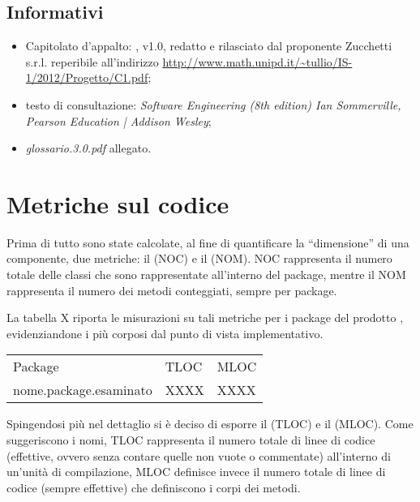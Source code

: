\subsection{Informativi}
\begin{itemize}
\item[] Capitolato d'appalto: \caName{}, v1.0, redatto e rilasciato dal proponente Zucchetti s.r.l. reperibile all'indirizzo \url{http://www.math.unipd.it/~tullio/IS-1/2012/Progetto/C1.pdf};
\item[] testo di consultazione: \textit{Software Engineering (8th edition) Ian Sommerville, Pearson Education | Addison Wesley};
\item[] \textit{glossario.3.0.pdf} allegato.
\end{itemize}
\clearpage

\section{Metriche sul codice}
Prima di tutto sono state calcolate, al fine di quantificare la ``dimensione'' di una componente, due metriche: il  (NOC) e il  (NOM).
NOC rappresenta il numero totale delle classi che sono rappresentate all'interno del package, mentre il NOM rappresenta il numero dei metodi conteggiati, sempre per package.

La tabella X riporta le misurazioni su tali metriche per i package del prodotto \caName{}, evidenziandone i più corposi dal punto di vista implementativo.


\begin{center}
\begin{longtable}{p{}ll}
\toprule Package & TLOC  & MLOC\\
nome.package.esaminato & XXXX & XXXX\\
\midrule

\bottomrule
\end{longtable}
\end{center}


Spingendosi più nel dettaglio si è deciso di esporre il  (TLOC) e il  (MLOC).
Come suggeriscono i nomi, TLOC rappresenta il numero totale di linee di codice (effettive, ovvero senza contare quelle non vuote o commentate) all'interno di un'unità di compilazione, MLOC definisce invece il numero totale di linee di codice (sempre effettive) che definiscono i corpi dei metodi. 

